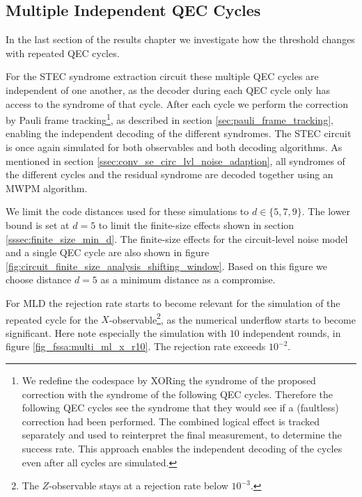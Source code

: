 \subsection{Multiple Independent QEC Cycles}\label{ssec:results_circ_multiple_cycles}

In the last section of the results chapter we investigate how the threshold changes with repeated QEC cycles. 

For the STEC syndrome extraction circuit these multiple QEC cycles are independent of one another, 
as the decoder during each QEC cycle only has access to the syndrome of that cycle. 
After each cycle we perform the correction by Pauli frame tracking\footnote{
    We redefine the codespace by XORing the syndrome of the proposed correction with the syndrome of the following QEC cycles. 
    Therefore the following QEC cycles see the syndrome that they would see if a (faultless) correction had been performed.
    The combined logical effect is tracked separately and used to reinterpret the final measurement, to determine the success rate.
    This approach enables the independent decoding of the cycles even after all cycles are simulated.
}, as described in section \ref{sec:pauli_frame_tracking}, 
enabling the independent decoding of the different syndromes.
The STEC circuit is once again simulated for both observables and both decoding algorithms. 
As mentioned in section \ref{ssec:conv_se_circ_lvl_noise_adaption}, 
all syndromes of the different cycles and the residual syndrome are decoded together using an MWPM algorithm. 

We limit the code distances used for these simulations to $d \in \{5,7,9\}$.
The lower bound is set at $d=5$ to limit the finite-size effects shown in section \ref{sssec:finite_size_min_d}.
The finite-size effects for the circuit-level noise model and a single QEC cycle are also shown in figure \ref{fig:circuit_finite_size_analysis_shifting_window}.
Based on this figure we choose distance $d=5$ as a minimum distance as a compromise.

For MLD the rejection rate starts to become relevant for the simulation of the repeated cycle for the $X$-observable\footnote{
    The $Z$-observable stays at a rejection rate below $10^{-3}$.
}, as the numerical underflow starts to become significant. 
Here note especially the simulation with $10$ independent rounds, in figure \ref{fig_fssa:multi_ml_x_r10}. 
The rejection rate exceeds $10^{-2}$.

